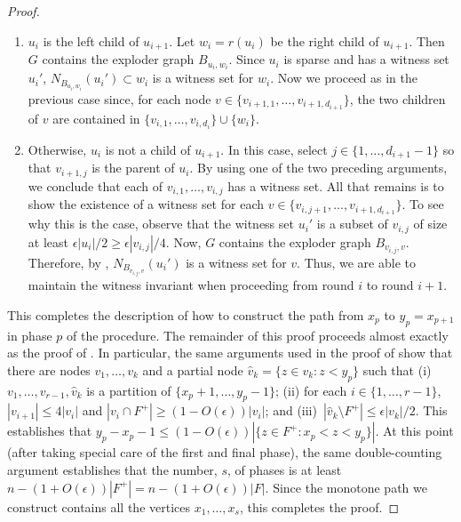 \documentclass{patmorin}
\begin{document}
\begin{proof}
\begin{enumerate}
   \item $u_i$ is the left child of $u_{i+1}$. Let $w_i=r(u_i)$
   be the right child of $u_{i+1}$. Then $G$ contains the exploder
   graph $B_{u_i,w_i}$.  Since $u_i$ is sparse and has a witness set
   $u_i'$, $N_{B_{u_i,w_i}}(u_i')\subset w_i$ is a witness set for
   $w_i$.  Now we proceed as in the previous case since, for each node
   $v\in\{v_{i+1,1},\ldots,v_{i+1,d_{i+1}}\}$, the two children of $v$
   are contained in $\{v_{i,1},\ldots,v_{i,d_i}\}\cup\{w_i\}$.

   \item Otherwise, $u_i$ is not a child of $u_{i+1}$. In this case,
   select $j\in\{1,\ldots,d_{i+1}-1\}$ so that $v_{i+1,j}$ is the parent
   of $u_i$.  By using one of the two preceding arguments, we conclude
   that each of $v_{i,1},\ldots,v_{i,j}$ has a witness set.  All that
   remains is to show the existence of a witness set for each
   $v\in\{v_{i,j+1},\ldots,v_{i+1,d_{i+1}}\}$.	To see
   why this is the case, observe that the witness set
   $u_i'$ is a subset of $v_{i,j}$ of size at least
   $\epsilon|u_i|/2\ge \epsilon|v_{i,j}|/4$.   Now,
   $G$ contains the exploder graph $B_{v_{i,j},v}$.
   Therefore, by , $N_{B_{v_{i,j},v}}(u_i')$
   is a witness set for $v$.  Thus, we are able to maintain
   the witness invariant when proceeding from round $i$
   to round $i+1$.
   \end{enumerate}
         
   This completes the description of how to construct the path
   from $x_p$ to $y_p=x_{p+1}$ in phase $p$ of the procedure.
   The remainder of this proof proceeds almost exactly as the proof
   of .  In particular, the same arguments
   used in the proof of  show that there are
   nodes $v_1,\ldots,v_{k}$ and a partial node $\hat{v}_k=\{z\in v_k: z<
   y_p\}$ such that (i)~$v_1,\ldots,v_{r-1},\hat{v}_k$ is a partition
   of $\{x_p+1,\ldots,y_p-1\}$; (ii) for each $i\in\{1,\ldots,r-1\}$,
   $|v_{i+1}|\le 4|v_i|$ and $|v_i\cap F^+|\ge (1-O(\epsilon))|v_i|$; and
   (iii)~$|\hat{v}_k\setminus F^+|\le\epsilon|v_k|/2$.  This establishes
   that $y_p-x_p-1 \le (1-O(\epsilon))|\{z\in F^+:x_p < z<y_p\}|$.
   At this point (after taking special care of the first and final phase),
   the same double-counting argument establishes that the number, $s$, of
   phases is at least $n-(1+O(\epsilon))|F^+|=n-(1+O(\epsilon))|F|$. Since
   the monotone path we construct contains all the vertices
   $x_1,\ldots,x_s$, this completes the proof.
\end{proof}
\end{document}
